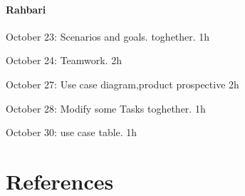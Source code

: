 \documentclass{article}
\begin{document}
	\paragraph{Rahbari}
		\begin{list}{-}{}
			\item October 23: Scenarios and goals. toghether. 1h
			\item October 24: Teamwork. 2h
			\item October 27: Use case diagram,product prospective 2h
			\item October 28: Modify some Tasks toghether. 1h
			\item October 30: use case table. 1h
		\end{list}
\section{References}
\end{document}
